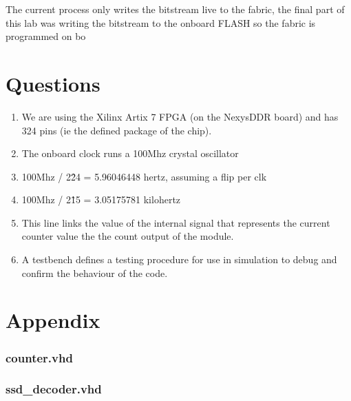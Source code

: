 \documentclass[11pt]{article}
\begin{document}
\begin{preview}
        The current process only writes the bitstream live to the fabric, the final part of this lab was writing the bitstream to the onboard FLASH so the fabric is programmed on bo

\section{Questions}

\begin{enumerate}
        \item We are using the Xilinx Artix 7 FPGA (on the NexysDDR board) and has 324 pins (ie the defined package of the chip). 
        \item The onboard clock runs a 100Mhz crystal oscillator
        \item 100Mhz / 2\^24 = 5.96046448 hertz, assuming a flip per clk
        \item 100Mhz / 2\^15 = 3.05175781 kilohertz
        \item This line links the value of the internal signal that represents the current counter value the the count output of the module.
        \item A testbench defines a testing procedure for use in simulation to debug and confirm the behaviour of the code.
\end{enumerate}

\section*{Appendix}
\subsubsection*{counter.vhd}

\vspace*{64px}
\subsubsection*{ssd\_decoder.vhd}


\end{preview}
\end{document}
